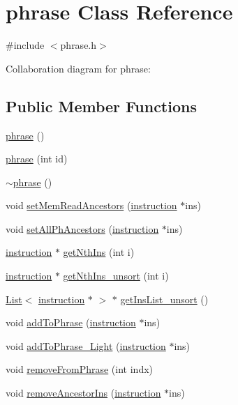 \hypertarget{classphrase}{
\section{phrase Class Reference}
\label{classphrase}
}


{\ttfamily \#include $<$phrase.h$>$}



Collaboration diagram for phrase:
\subsection*{Public Member Functions}
\begin{DoxyCompactItemize}
\item 
\hyperlink{classphrase_a5439a7d7df8363555af7cb2746f05f54}{phrase} ()
\item 
\hyperlink{classphrase_a8df8c428377443398960bf7332a20248}{phrase} (int id)
\item 
\hyperlink{classphrase_a56e851a378479e92c1428e1c8a21018a}{$\sim$phrase} ()
\item 
void \hyperlink{classphrase_a486ed90f05206280c5a03441acd3f181}{setMemReadAncestors} (\hyperlink{classinstruction}{instruction} $\ast$ins)
\item 
void \hyperlink{classphrase_a6e02c8bca1014c332e8d137be57193a4}{setAllPhAncestors} (\hyperlink{classinstruction}{instruction} $\ast$ins)
\item 
\hyperlink{classinstruction}{instruction} $\ast$ \hyperlink{classphrase_a724c3f11701e830eb5b10be7b62476d5}{getNthIns} (int i)
\item 
\hyperlink{classinstruction}{instruction} $\ast$ \hyperlink{classphrase_adc61714187e77bc7c1ff2054b2312749}{getNthIns\_\-unsort} (int i)
\item 
\hyperlink{classList}{List}$<$ \hyperlink{classinstruction}{instruction} $\ast$ $>$ $\ast$ \hyperlink{classphrase_acc24a3eb40ef0fbccecaca50ebe3fd81}{getInsList\_\-unsort} ()
\item 
void \hyperlink{classphrase_a747fdf8e7ac40b4bad71d20129ae0e73}{addToPhrase} (\hyperlink{classinstruction}{instruction} $\ast$ins)
\item 
void \hyperlink{classphrase_afcb54ecdecbf37e7395ac8dcc7019592}{addToPhrase\_\-Light} (\hyperlink{classinstruction}{instruction} $\ast$ins)
\item 
void \hyperlink{classphrase_a3eaff820376bfb18d2a2566dba447980}{removeFromPhrase} (int indx)
\item 
void \hyperlink{classphrase_ab4c978f51c02eb688ecd0d32245c09b5}{removeAncestorIns} (\hyperlink{classinstruction}{instruction} $\ast$ins)

\end{DoxyCompactItemize}
